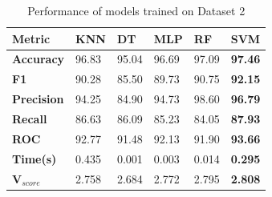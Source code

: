 \begin{table}[H]
  \centering
  \caption{Performance of models trained on Dataset 2}\label{tab:performance_of_models_trained_on_dataset_2}
  \begin{tabular}{|p{5em}|C{3em}|C{3em}|C{3em}|C{3em}|C{3em}|}
    \hline
    \textbf{Metric}      & \textbf{KNN} & \textbf{DT} & \textbf{MLP} & \textbf{RF} & \textbf{SVM}   \\
    \hline
    \textbf{Accuracy}    & 96.83        & 95.04       & 96.69        & 97.09       & \textbf{97.46} \\
    \textbf{F1}          & 90.28        & 85.50       & 89.73        & 90.75       & \textbf{92.15} \\
    \textbf{Precision}   & 94.25        & 84.90       & 94.73        & 98.60       & \textbf{96.79} \\
    \textbf{Recall}      & 86.63        & 86.09       & 85.23        & 84.05       & \textbf{87.93} \\
    \textbf{ROC}         & 92.77        & 91.48       & 92.13        & 91.90       & \textbf{93.66} \\
    \textbf{Time(s)}     & 0.435        & 0.001       & 0.003        & 0.014       & \textbf{0.295} \\
    \hline
    \textbf{V$_{score}$} & 2.758        & 2.684       & 2.772        & 2.795       & \textbf{2.808} \\
    \hline
  \end{tabular}
\end{table}

